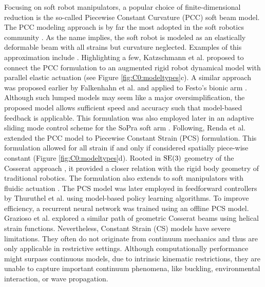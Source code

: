 %
\par
Focusing on soft robot manipulators, a popular choice of finite-dimensional reduction is the so-called Piecewise Constant Curvature (PCC) soft beam model. The PCC modeling approach is by far the most adopted in the soft robotics community \cite{Webster2010}. As the name implies, the soft robot is modeled as an elastically deformable beam with all strains but curvature neglected. Examples of this approximation include \cite{Falkenhahn2015,Marchese2016,Katzschmann2018,Katzschmann2019,Runge2017,Franco2020,Webster2010,DellaSantina2020a}. Highlighting a few, Katzschmann et al. \cite{Katzschmann2018} proposed to connect the PCC formulation to an augmented rigid robot dynamical model with parallel elastic actuation (see Figure \ref{fig:C0:modeltypes}c). A similar approach was proposed earlier by Falkenhahn et al. \cite{Falkenhahn2015} and applied to Festo's bionic arm \cite{Grzesiak2011}. Although such lumped models may seem like a major oversimplification, the proposed model allows sufficient speed and accuracy such that model-based feedback is applicable. This formulation was also employed later in an adaptive sliding mode control scheme \cite{Kazemipour2022May} for the SoPra soft arm \cite{Toshimitsu2021Sep}. Following, Renda et al. \cite{Renda2018} extended the PCC model to Piecewise Constant Strain (PCS) formulation. This formulation allowed for all strain if and only if considered spatially piece-wise constant (Figure \ref{fig:C0:modeltypes}d). Rooted in $\textup{\textrm{SE}}(3)$ geometry of the Cosserat approach \cite{Simo1986}, it provided a closer relation with the rigid body geometry of traditional robotics. The formulation also extends to soft manipulators with fluidic actuation \cite{Renda2017Aug, Till2019}. The PCS model was later employed in feedforward controllers by Thuruthel et al. \cite{Thuruthel2018Nov} using model-based policy learning algorithms. To improve efficiency, a recurrent neural network was trained using an offline PCS model. Grazioso et al. \cite{Grazioso2019} explored a similar path of geometric Cosserat beams using helical strain functions. Nevertheless, Constant Strain (CS) models have severe limitations. They often do not originate from continuum mechanics and thus are only applicable in restrictive settings. Although computationally performance might surpass continuous models, due to intrinsic kinematic restrictions, they are unable to capture important continuum phenomena, like buckling, environmental interaction, or wave propagation.

